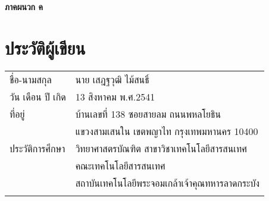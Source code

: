	

\clearpage 
\thispagestyle{empty}
\begin{center}
	\LARGE{\textbf{ภาคผนวก ค}}
\end{center}

\chapter{ประวัติผู้เขียน}
\begin{tabularx}{\linewidth}{lX}
	ชื่อ-นามสกุล&นาย เสฎฐวุฒิ ไม้สนธิ์\\
	วัน เดือน ปี เกิด&13 สิงหาคม พ.ศ.2541\\
	ที่อยู่& บ้านเลขที่ 138 ซอยสายลม ถนนพหลโยธิน 
	\\
	&แขวงสามเสนใน เขตพญาไท กรุงเทพมหานคร 10400
	\\
	ประวัติการศึกษา&วิทยาศาสตรบัณฑิต สาขาวิชาเทคโนโลยีสารสนเทศ
	\\
	&คณะเทคโนโลยีสารสนเทศ
	\\
	&สถาบันเทคโนโลยีพระจอมเกล้าเจ้าคุณทหารลาดกระบัง
	\\
	\\
\end{tabularx}